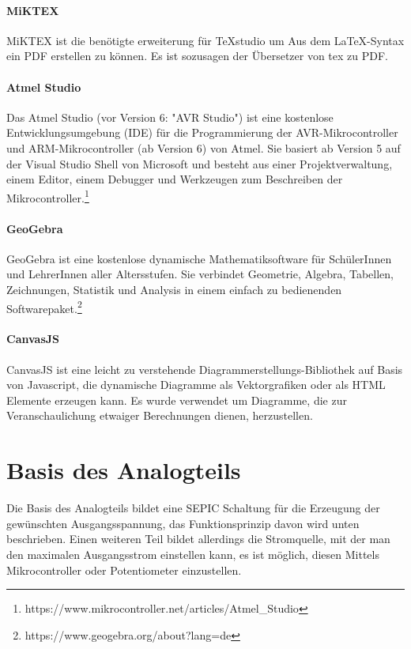 \documentclass[paper=a4, 12pt]{scrreprt}
\begin{document}
	\paragraph{MiKTEX}\hfill \break
	MiKTEX ist die benötigte erweiterung für TeXstudio um Aus dem LaTeX-Syntax ein PDF erstellen zu können. Es ist sozusagen der Übersetzer von tex zu PDF. \newpage
	\paragraph{Atmel Studio}\hfill \break
	Das Atmel Studio (vor Version 6: "AVR Studio") ist eine kostenlose Entwicklungsumgebung (IDE) für die Programmierung der AVR-Mikrocontroller und ARM-Mikrocontroller (ab Version 6) von Atmel. Sie basiert ab Version 5 auf der Visual Studio Shell von Microsoft und besteht aus einer Projektverwaltung, einem Editor, einem Debugger und Werkzeugen zum Beschreiben der Mikrocontroller.\footnote{https://www.mikrocontroller.net/articles/Atmel\_Studio}
	\paragraph{GeoGebra}\hfill \break
	GeoGebra ist eine kostenlose dynamische Mathematiksoftware für SchülerInnen und LehrerInnen aller Altersstufen. Sie verbindet Geometrie, Algebra, Tabellen, Zeichnungen, Statistik und Analysis in einem einfach zu bedienenden Softwarepaket.\footnote{https://www.geogebra.org/about?lang=de}
	\paragraph{CanvasJS}\hfill \break
	CanvasJS ist eine leicht zu verstehende Diagrammerstellungs-Bibliothek auf Basis von Javascript, die dynamische Diagramme als Vektorgrafiken oder als HTML Elemente erzeugen kann. Es wurde verwendet um Diagramme, die zur Veranschaulichung etwaiger Berechnungen dienen, herzustellen.
	\newpage
	
	\section{Basis des Analogteils}\hfill \break
	Die Basis des Analogteils bildet eine SEPIC Schaltung für die Erzeugung der gewünschten Ausgangsspannung, das Funktionsprinzip davon wird unten beschrieben. Einen weiteren Teil bildet allerdings die Stromquelle, mit der man den maximalen Ausgangsstrom einstellen kann, es ist möglich, diesen Mittels Mikrocontroller oder Potentiometer einzustellen.
\end{document}
